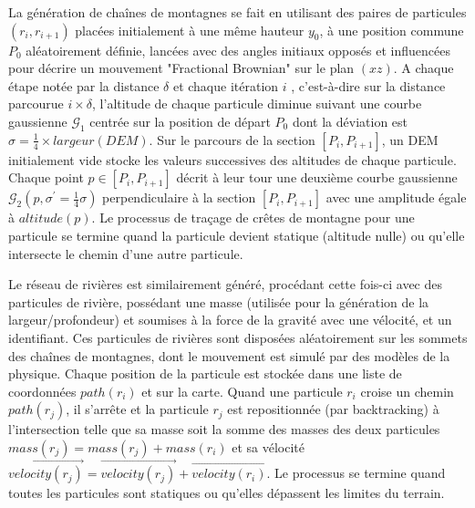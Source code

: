 \documentclass[11pt]{article}
\begin{document}
La génération de chaînes de montagnes se fait en utilisant des paires de particules $(r_i, r_{i+1})$ placées initialement à une même hauteur $y_0$, à une position commune $P_{0}$ aléatoirement définie, lancées avec des angles initiaux opposés et influencées pour décrire un mouvement "Fractional Brownian" sur le plan $(xz)$. A chaque étape notée par la distance $\delta$ et chaque itération $i$ , c'est-à-dire sur la distance parcourue $i \times \delta$, l'altitude de chaque particule diminue suivant une courbe gaussienne $\mathcal{G}_1$ centrée sur la position de départ $P_{0}$ dont la déviation est $\sigma = \frac{1}{4} \times largeur(DEM)$. Sur le parcours de la section $[P_i, P_{i+1}]$, un DEM initialement vide stocke les valeurs successives des altitudes de chaque particule. Chaque point $p \in [P_i, P_{i+1}]$  décrit à leur tour une deuxième courbe gaussienne $\mathcal{G}_2(p, \sigma^{\prime} = \frac{1}{4}\sigma)$ perpendiculaire à la section $[P_i, P_{i+1}]$ avec une amplitude égale à $altitude(p)$. Le processus de traçage de crêtes de montagne pour une particule se termine quand la particule devient statique (altitude nulle) ou qu'elle intersecte le chemin d'une autre particule.

Le réseau de rivières est similairement généré, procédant cette fois-ci avec des particules de rivière, possédant une masse (utilisée pour la génération de la largeur/profondeur) et soumises à la force de la gravité avec une vélocité, et un identifiant. Ces particules de rivières sont disposées aléatoirement sur les sommets des chaînes de montagnes, dont le mouvement est simulé par des modèles de la physique. Chaque position de la particule est stockée dans une liste de coordonnées $path(r_i)$ et sur la carte. Quand une particule $r_i$ croise un chemin $path(r_j)$, il s'arrête et la particule $r_j$ est repositionnée (par backtracking) à l'intersection telle que sa masse soit la somme des masses des deux particules $mass(r_j) = mass(r_j) + mass(r_i)$ et sa vélocité $\overrightarrow{velocity(r_j)} = \overrightarrow{velocity(r_j)} + \overrightarrow{velocity(r_i)}$. Le processus se termine quand toutes les particules sont statiques ou qu'elles dépassent les limites du terrain.
\end{document}
